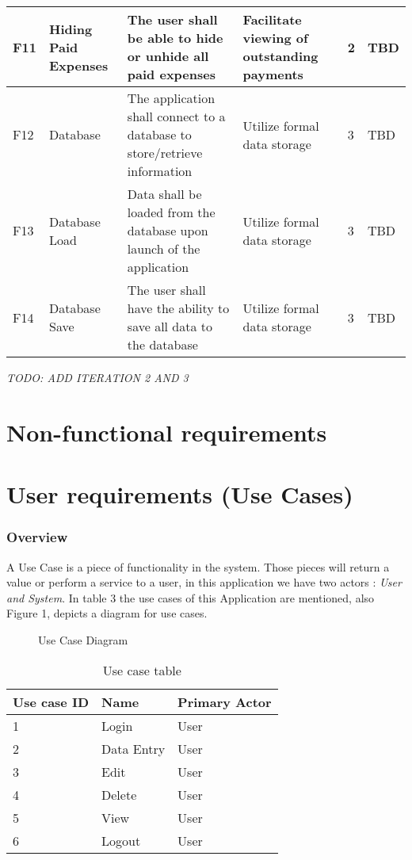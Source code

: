 \documentclass[12pt]{article}
\begin{document}
\begin{table}[htbp]
\begin{center}
\begin{tabular}{|p{6mm}|p{16mm}|p{48mm}|p{40mm}|p{14mm}|p{10mm}|}
\hline
F11 & Hiding Paid Expenses & The user shall be able to hide or unhide all paid expenses & Facilitate viewing of outstanding payments & 2 & TBD\\
\hline
F12 & Database & The application shall connect to a database to store/retrieve information & Utilize formal data storage & 3 & TBD\\
\hline
F13 & Database Load & Data shall be loaded from the database upon launch of the application & Utilize formal data storage & 3 & TBD\\
\hline
F14 & Database Save & The user shall have the ability to save all data to the database & Utilize formal data storage & 3 & TBD\\
\hline
\end{tabular}
\end{center}
\end{table}
\emph{ TODO: ADD ITERATION 2 AND 3 }

\section{Non-functional requirements} \label{nfuncReq}

\section{User requirements  (Use Cases)} \label{userReq}

\subsubsection{Overview} \label{reqOverview}
A Use Case is a piece of functionality in the system. Those pieces will return a value or perform a service to a user, in this application we have two actors : \textit{User and System}.
In table 3 the use cases of this Application are mentioned, also Figure 1, depicts a diagram for use cases.


\begin{figure}[htbp]
\caption{Use Case Diagram}
\label{fig:use-case-diagram}
\end{figure}


\begin{table}[htbp]
\caption{Use case table}
\begin{center}
\begin{tabular}{|l | l|l|}
\hline
Use case ID&Name	&Primary Actor\\
\hline\hline
1	&	Login&	User\\
\hline
2	&	Data Entry&	User	\\
\hline
3	&	Edit		&User\\
\hline
4	&	Delete		&User\\
\hline
5	&	View		&User\\
\hline
6 	&	Logout	&	User\\

\hline

\end{tabular}
\end{center}
\end{table}
\end{document}
